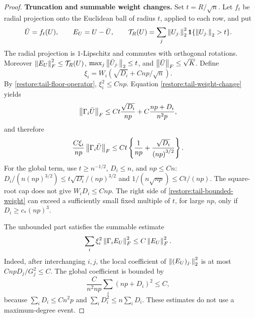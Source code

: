 \begin{proof}
\medskip\noindent\textbf{Truncation and summable weight changes.}
Set $t=R/\sqrt n$.  Let $f_t$ be radial projection onto the Euclidean
ball of radius $t$, applied to each row, and put
\[
 \bar U=f_t(U),\qquad E_U=U-\bar U,\qquad
 \mathcal T_R(U)=\sum_j\left\lVert U_{j\cdot}\right\rVert_2^2
                         \mathbf1\{\left\lVert U_{j\cdot}\right\rVert_2>t\}.
\]
The radial projection is $1$-Lipschitz and commutes with orthogonal
rotations.  Moreover $\left\lVert E_U\right\rVert_F^2\le \mathcal T_R(U)$,
$\max_j\left\lVert\bar U_{j\cdot}\right\rVert_2\le t$, and $\left\lVert\bar U\right\rVert_F\le\sqrt K$.
Define
\[
 \xi_i=W_i\left(\sqrt{D_i}+C{np}/\sqrt n\right).
\]
By \eqref{restore:tail-floor-operator}, $\xi_i^2\le C{np}$.
Equation \eqref{restore:tail-weight-change} yields
\[
 \left\lVert\Gamma_i\bar U\right\rVert_F
 \le Ct\frac{\sqrt{D_i}}{np}+C\frac{{np}+D_i}{{n^2p}},
\]
and therefore
\begin{equation}
 \frac{C\xi_i}{np}\left\lVert\Gamma_i\bar U\right\rVert_F
 \le Ct\left\{\frac1{np}+\frac{\sqrt{D_i}}{{(np)}^{3/2}}\right\}.
 \label{restore:tail-bounded-weight}
\end{equation}
For the global term, use $t\ge n^{-1/2}$, $D_i\le n$, and
${np}\le Cn$: $D_i/(n{(np)}^{3/2})\le t\sqrt{D_i}/{(np)}^{3/2}$ and
$1/(n\sqrt {np})\le Ct/(np)$.
The square-root cap does not give $W_iD_i\le C{np}$. The
right side of \eqref{restore:tail-bounded-weight} can exceed a
sufficiently small fixed multiple of $t$, for large ${np}$, only if
$D_i\ge c_*{(np)}^3$.

The unbounded part satisfies the summable estimate
\begin{equation}
 \sum_i\xi_i^2\left\lVert\Gamma_iE_U\right\rVert_F^2\le C\left\lVert E_U\right\rVert_F^2.
 \label{restore:tail-summable-weight}
\end{equation}
Indeed, after interchanging $i,j$, the local coefficient of
$\left\lVert(E_U)_{j\cdot}\right\rVert_2^2$ is at most
$C{np}D_j/G_j^2\le C$.
The global coefficient is bounded by
\[
 \frac{C}{n^2{np}}\sum_i({np}+D_i)^2\le C,
\]
because $\sum_iD_i\le C{n^2p}$ and
$\sum_iD_i^2\le n\sum_iD_i$.
These estimates do not use a maximum-degree event.


\end{proof}
